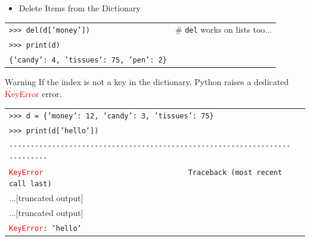 \documentclass[t,handout,9pt]{beamer}
\begin{document}
\begin{frame}
\begin{itemize}
	\item Delete Items from the Dictionary
\end{itemize}
\begin{table}[]
\begin{flushleft}
\begin{tabular}{ll}
\texttt{>{}>{}> del(d['money'])} &  \# \texttt{del} works on lists too...\\
\texttt{>{}>{}> print(d)} & \\
\texttt{\{'candy': 4, 'tissues': 75, 'pen': 2\}} &  \\
\end{tabular}
\end{flushleft}
\end{table}
\end{frame}
%
\begin{frame}
\vfill
\begin{block}{Warning}
If the index is not a key in the dictionary, Python raises a dedicated \textcolor{red}{KeyError} error.
\end{block}
\begin{table}[]
\begin{flushleft}
\begin{tabular}{ll}
\texttt{>{}>{}> d = \{'money': 12, 'candy': 3, 'tissues': 75\}} &  \\
\texttt{>{}>{}> print(d['hello'])} & \\
\texttt{-{}-{}-{}-{}-{}-{}-{}-{}-{}-{}-{}-{}-{}-{}-{}-{}-{}-{}-{}-{}-{}-{}-{}-{}-{}-{}-{}-{}-{}-{}-{}-{}-{}-{}-{}-{}-{}-{}-{}-{}-{}-{}-{}-{}-{}-{}-{}-{}-{}-{}-{}-{}-{}-{}-{}-{}-{}-{}-{}-{}-{}-{}-{}-{}-{}-{}-{}-{}-{}-{}-{}-{}-{}-{}-{}} &  \\
\texttt{\textcolor{red}{KeyError} \ \ \ \ \ \ \ \ \ \ \ \ \ \ \ \ \ \ \ \ \ \ \ \ \ \ \ \ \ \ \ \ \ Traceback (most recent call last)} &  \\
...[truncated output] &  \\
...[truncated output] &  \\
\texttt{\textcolor{red}{KeyError}: 'hello'} &  \\
\end{tabular}
\end{flushleft}
\end{table}
\vfill
\end{frame}
%
\end{document}
